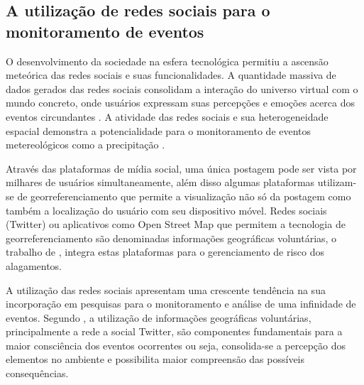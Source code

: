 \subsection{A utilização de redes sociais para o monitoramento de eventos}
O desenvolvimento da sociedade na esfera tecnológica permitiu a ascensão meteórica das redes sociais e suas funcionalidades. A quantidade massiva de dados gerados das redes sociais consolidam a interação do universo virtual com o mundo concreto, onde usuários expressam suas percepções e emoções acerca dos eventos circundantes \cite{naaman2011geographic}. A atividade das redes sociais e sua heterogeneidade espacial demonstra a potencialidade para o monitoramento de eventos metereológicos como a precipitação \cite{de2021effect}. 
\par Através das plataformas de mídia social, uma única postagem pode ser vista por milhares de usuários simultaneamente, além disso algumas plataformas utilizam-se de georreferenciamento que permite a visualização não só da postagem como também a localização do usuário com seu dispositivo móvel. Redes sociais (Twitter) ou aplicativos como Open Street Map que permitem a tecnologia de georreferenciamento são denominadas informações geográficas voluntárias, o trabalho de \cite{horita2015development}, integra estas plataformas para o gerenciamento de risco dos alagamentos. 
 \par A utilização das redes sociais apresentam uma crescente tendência na sua incorporação em pesquisas para o monitoramento e análise de uma infinidade de eventos. Segundo \cite{de2015geographic}, a utilização de informações geográficas voluntárias, principalmente a rede a social Twitter, são componentes fundamentais para a maior consciência dos eventos ocorrentes ou seja, consolida-se a percepção dos elementos no ambiente e possibilita maior compreensão das possíveis consequências. 
 
 
